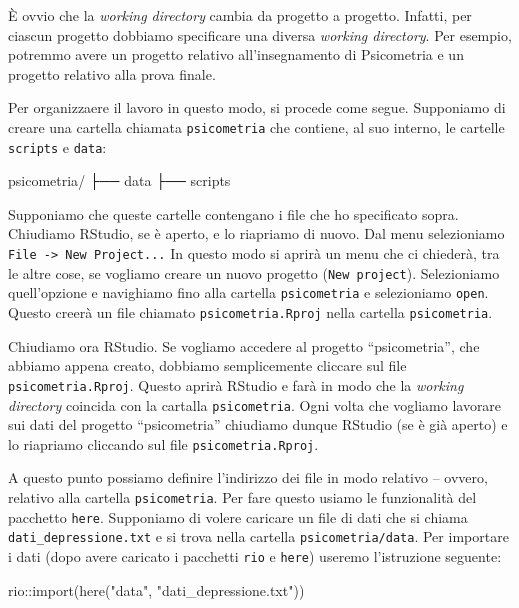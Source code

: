 \documentclass[
  11pt,
]{krantz}
\makeatletter
\newenvironment{Shaded}{\begin{snugshade}}{\end{snugshade}}
\newcommand{\FunctionTok}[1]{\textcolor[rgb]{0,0,0}{#1}}
\newcommand{\NormalTok}[1]{#1}
\newcommand{\SpecialCharTok}[1]{\textcolor[rgb]{0,0,0}{#1}}
\newcommand{\StringTok}[1]{\textcolor[rgb]{0.5,0.5,0.5}{#1}}
\newenvironment{kframe}{%
\medskip{}
\setlength{\fboxsep}{.8em}
 \def\at@end@of@kframe{}%
 \ifinner\ifhmode%
  \def\at@end@of@kframe{\end{minipage}}%
  \begin{minipage}{\columnwidth}%
 \fi\fi%
 \def\FrameCommand##1{\hskip\@totalleftmargin \hskip-\fboxsep
 \colorbox{shadecolor}{##1}\hskip-\fboxsep
     \hskip-\linewidth \hskip-\@totalleftmargin \hskip\columnwidth}%
 \MakeFramed {\advance\hsize-\width
   \@totalleftmargin\z@ \linewidth\hsize
   \@setminipage}}%
 {\par\unskip\endMakeFramed%
 \at@end@of@kframe}
\renewenvironment{Shaded}{\begin{kframe}}{\end{kframe}}
\theoremstyle{definition}
\theoremstyle{definition}
\theoremstyle{definition}
\theoremstyle{definition}
\theoremstyle{remark}
\makeatother
\begin{document}
È ovvio che la \emph{working directory} cambia da progetto a progetto. Infatti, per ciascun progetto dobbiamo specificare una diversa \emph{working directory}. Per esempio, potremmo avere un progetto relativo all'insegnamento di Psicometria e un progetto relativo alla prova finale.

Per organizzaere il lavoro in questo modo, si procede come segue. Supponiamo di creare una cartella chiamata \texttt{psicometria} che contiene, al suo interno, le cartelle \texttt{scripts} e \texttt{data}:

\begin{Shaded}
\begin{Highlighting}[]
\NormalTok{psicometria}\SpecialCharTok{/}
\NormalTok{  ├── data}
\NormalTok{  ├── scripts}
\end{Highlighting}
\end{Shaded}

Supponiamo che queste cartelle contengano i file che ho specificato sopra. Chiudiamo RStudio, se è aperto, e lo riapriamo di nuovo. Dal menu selezioniamo \texttt{File\ -\textgreater{}\ New\ Project...} In questo modo si aprirà un menu che ci chiederà, tra le altre cose, se vogliamo creare un nuovo progetto (\texttt{New\ project}). Selezioniamo quell'opzione e navighiamo fino alla cartella \texttt{psicometria} e selezioniamo \texttt{open}. Questo creerà un file chiamato \texttt{psicometria.Rproj} nella cartella \texttt{psicometria}.

Chiudiamo ora RStudio. Se vogliamo accedere al progetto ``psicometria'', che abbiamo appena creato, dobbiamo semplicemente cliccare sul file \texttt{psicometria.Rproj}. Questo aprirà RStudio e farà in modo che la \emph{working directory} coincida con la cartalla \texttt{psicometria}. Ogni volta che vogliamo lavorare sui dati del progetto ``psicometria'' chiudiamo dunque RStudio (se è già aperto) e lo riapriamo cliccando sul file \texttt{psicometria.Rproj}.

A questo punto possiamo definire l'indirizzo dei file in modo relativo -- ovvero, relativo alla cartella \texttt{psicometria}. Per fare questo usiamo le funzionalità del pacchetto \texttt{here}. Supponiamo di volere caricare un file di dati che si chiama \texttt{dati\_depressione.txt} e si trova nella cartella \texttt{psicometria/data}. Per importare i dati (dopo avere caricato i pacchetti \texttt{rio} e \texttt{here}) useremo l'istruzione seguente:

\begin{Shaded}
\begin{Highlighting}[]
\NormalTok{rio}\SpecialCharTok{::}\FunctionTok{import}\NormalTok{(}\FunctionTok{here}\NormalTok{(}\StringTok{"data"}\NormalTok{, }\StringTok{"dati\_depressione.txt"}\NormalTok{))}
\end{Highlighting}
\end{Shaded}
\end{document}
